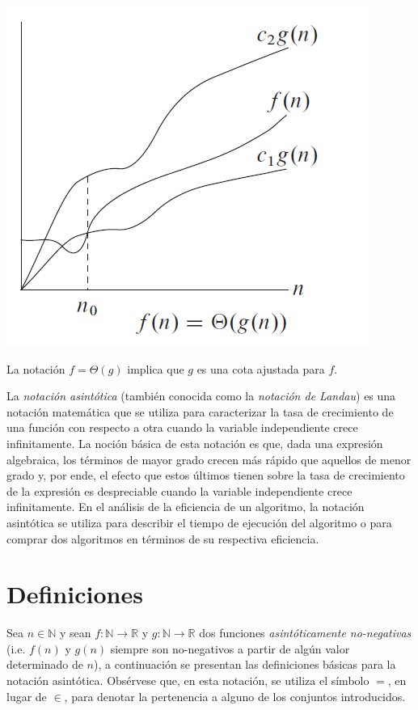 \begin{marginfigure}
  \includegraphics[width=\linewidth]{figuras/big-theta}
  \caption{La notación \(f=\Theta(g)\) implica que \(g\) es una cota ajustada para \(f\).}
\end{marginfigure}

La \emph{notación asintótica} (también conocida como la \emph{notación de Landau}) es una notación matemática que se utiliza para caracterizar la tasa de crecimiento de una función con respecto a otra cuando la variable independiente crece infinitamente.
La noción básica de esta notación es que, dada una expresión algebraica, los términos de mayor grado crecen más rápido que aquellos de menor grado y, por ende, el efecto que estos últimos tienen sobre la tasa de crecimiento de la expresión es despreciable cuando la variable independiente crece infinitamente. 
En el análisis de la eficiencia de un algoritmo, la notación asintótica se utiliza para describir el tiempo de ejecución del algoritmo o para comprar dos algoritmos en términos de su respectiva eficiencia.

\section{Definiciones}

Sea $n\in\mathbb{N}$ y sean $f:\mathbb{N}\to\mathbb{R}$ y $g:\mathbb{N}\to\mathbb{R}$
dos funciones \emph{asintóticamente no-negativas} (i.e. $f(n)$ y $g(n)$
siempre son no-negativos a partir de algún valor determinado de $n$), a continuación
se presentan las definiciones básicas para la notación asintótica. Obsérvese que, en 
esta notación, se utiliza el símbolo $=$, en lugar de 
$\in$, para denotar la pertenencia a alguno de los conjuntos introducidos.

